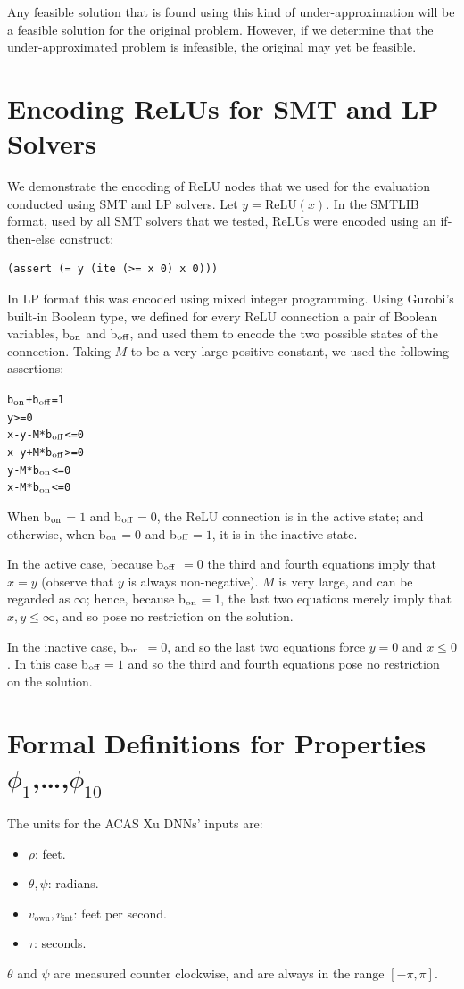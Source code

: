 \documentclass[a4paper]{llncs}
\newcommand{\relu}{\text{ReLU}\xspace{}}
\begin{document}
 Any feasible
solution that is found using this kind of under-approximation will be a feasible
solution for the original problem. However, if we determine that the
under-approximated problem is infeasible, the original may yet be
feasible.


\section{Encoding ReLUs for SMT and LP Solvers}
\label{appendix:encoding}
We demonstrate the encoding of ReLU nodes that we used for the
evaluation conducted using SMT and LP solvers. Let $y=\relu{}(x)$. In
the SMTLIB format, used by all SMT solvers that we tested, ReLUs were
encoded using an if-then-else construct: 

\begin{verbatim}
(assert (= y (ite (>= x 0) x 0)))
\end{verbatim}

\newcommand{\bon}{b\(\sb{\text{on}}\)}
\newcommand{\boff}{b\(\sb{\text{off}}\)}


In LP format this was encoded using mixed integer programming. Using
Gurobi's built-in Boolean type, we defined for every ReLU connection
a pair of Boolean variables, 
\bon{} and \boff{}, and used them to encode the two possible states of the connection.
Taking $M$ to be a very large positive constant, we used the following assertions:

\begin{alltt}
\bon{} + \boff{} = 1
y >= 0
x - y - M*\boff <= 0
x - y + M*\boff >= 0
y - M*\bon <= 0
x - M*\bon <= 0
\end{alltt}

When \bon{}$=1$ and \boff{}$=0$, the ReLU connection is in the active
state; and otherwise, when \bon{}$=0$ and \boff{}$=1$, it is in the inactive state.

 In the active case, because \boff{} $= 0$ the third and fourth
equations imply that $x=y$ (observe that $y$ is always non-negative). 
$M$ is very large, and can be regarded
as $\infty$; hence, because
\bon{}$=1$,  the last two equations merely imply that $x,y\leq\infty$,
and so pose no restriction on the solution.

In the inactive case, \bon{} $=0$, and so the last two equations force
$y=0$ and $x\leq 0$. In this case \boff{}$=1$ and so the third and fourth
 equations pose no restriction on the solution.

\section{Formal Definitions for Properties $\phi_1$,\ldots,$\phi_{10}$}
\label{appendix:properties}
The units for the ACAS Xu DNNs' inputs are:
\begin{itemize}
\item $\rho$: feet.
\item $\theta,\psi$: radians. 
\item $v_\text{own}, v_\text{int}$: feet per second.
\item $\tau$: seconds.
\end{itemize}
$\theta$ and $\psi$ are measured counter clockwise, and are always in
the range $[-\pi,\pi]$.
\end{document}
